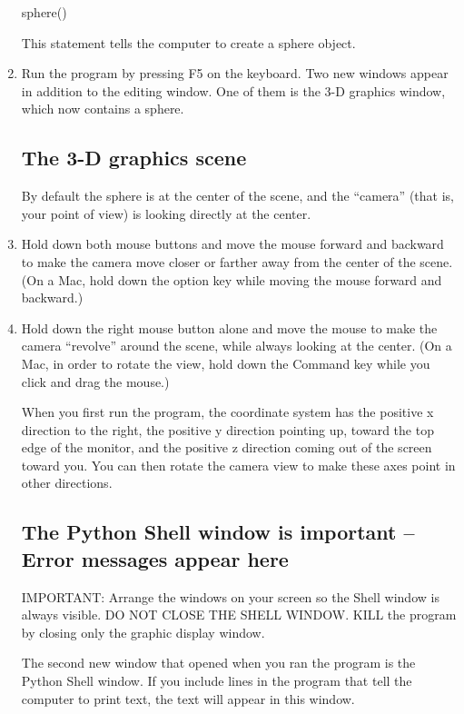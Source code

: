 \begin{enumerate}
\begin{myvpython}
sphere()
\end{myvpython}

This statement tells the computer to create a sphere object.

	\item Run the program by pressing F5 on the keyboard. Two new windows appear in addition to the editing window. One of them is the 3-D graphics window, which now contains a sphere.
	
	\subsection*{The 3-D graphics scene}
	
By default the sphere is at the center of the scene, and the ``camera'' (that is, your point of view) is looking directly at the center.
	
	\item Hold down both mouse buttons and move the mouse forward and backward to make the camera move closer or farther away from the center of the scene. (On a Mac, hold down the option key while moving the mouse forward and backward.)
	\item Hold down the right mouse button alone and move the mouse to make the camera ``revolve'' around the scene, while always looking at the center. (On a Mac, in order to rotate the view, hold down the Command key while you click and drag the mouse.)

When you first run the program, the coordinate system has the positive x direction to the right, the positive y direction pointing up, toward the top edge of the monitor, and the positive z direction coming out of the screen toward you. You can then rotate the camera view to make these axes point in other directions. 
	
	\subsection*{The Python Shell window is important -- Error messages appear here}
	
IMPORTANT: Arrange the windows on your screen so the Shell window is always visible.  
DO NOT CLOSE THE SHELL WINDOW.
KILL the program by closing only the graphic display window.

The second new window that opened when you ran the program is the Python Shell window. If you include lines in the program that tell the computer to print text, the text will appear in this window.


\end{enumerate}
